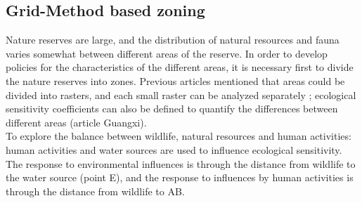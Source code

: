 \documentclass{mcmthesis}
\numberwithin{figure}{section}
\numberwithin{table}{section}
\numberwithin{equation}{section}
\begin{document}
\subsection{Grid-Method based zoning}
Nature reserves are large, and the distribution of natural resources and fauna varies somewhat between different areas of the reserve. In order to develop policies for the characteristics of the different areas, it is necessary first to divide the nature reserves into zones. Previous articles mentioned that areas could be divided into rasters, and each small raster can be analyzed separately \cite{1}; ecological sensitivity coefficients can also be defined to quantify the differences between different areas (article Guangxi).
\\
To explore the balance between wildlife, natural resources and human activities: human activities and water sources are used to influence ecological sensitivity. The response to environmental influences is through the distance from wildlife to the water source (point E), and the response to influences by human activities is through the distance from wildlife to AB.
\end{document}
